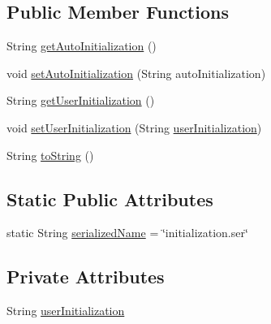 \subsection*{Public Member Functions}
\begin{DoxyCompactItemize}
\item 
String \hyperlink{classit_1_1isislab_1_1masonassisteddocumentation_1_1_o_d_d_1_1_initialization_a40775f92907ca6b60402e0aa7336ac42}{get\-Auto\-Initialization} ()
\item 
void \hyperlink{classit_1_1isislab_1_1masonassisteddocumentation_1_1_o_d_d_1_1_initialization_a95c25405be57859cfb4a2dfced2d3402}{set\-Auto\-Initialization} (String auto\-Initialization)
\item 
String \hyperlink{classit_1_1isislab_1_1masonassisteddocumentation_1_1_o_d_d_1_1_initialization_a541e2f93c4d0fe625d8884bf3d33bebc}{get\-User\-Initialization} ()
\item 
void \hyperlink{classit_1_1isislab_1_1masonassisteddocumentation_1_1_o_d_d_1_1_initialization_ad9c50dcf5467b063895ebb418190eeee}{set\-User\-Initialization} (String \hyperlink{classit_1_1isislab_1_1masonassisteddocumentation_1_1_o_d_d_1_1_initialization_a6b1893c7cd50b5b053020df213f7ec4e}{user\-Initialization})
\item 
String \hyperlink{classit_1_1isislab_1_1masonassisteddocumentation_1_1_o_d_d_1_1_initialization_a161826a9181c7d87cbfcb7a9bc8bdc96}{to\-String} ()
\end{DoxyCompactItemize}
\subsection*{Static Public Attributes}
\begin{DoxyCompactItemize}
\item 
static String \hyperlink{classit_1_1isislab_1_1masonassisteddocumentation_1_1_o_d_d_1_1_initialization_a68d6d76d36ac88da6784e304eb0c449d}{serialized\-Name} = \char`\"{}initialization.\-ser\char`\"{}
\end{DoxyCompactItemize}
\subsection*{Private Attributes}
\begin{DoxyCompactItemize}
\item 
String \hyperlink{classit_1_1isislab_1_1masonassisteddocumentation_1_1_o_d_d_1_1_initialization_a6b1893c7cd50b5b053020df213f7ec4e}{user\-Initialization}
\end{DoxyCompactItemize}
